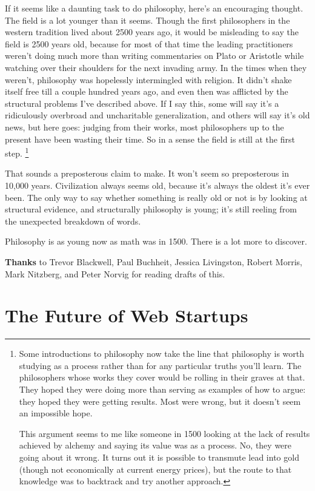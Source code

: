 \documentclass[12pt]{book}
\begin{document}
If it seems like a daunting task to do philosophy, here's an encouraging
thought. The field is a lot younger than it seems. Though the first
philosophers in the western tradition lived about 2500 years ago, it
would be misleading to say the field is 2500 years old, because for most
of that time the leading practitioners weren't doing much more than
writing commentaries on Plato or Aristotle while watching over their
shoulders for the next invading army. In the times when they weren't,
philosophy was hopelessly intermingled with religion. It didn't shake
itself free till a couple hundred years ago, and even then was afflicted
by the structural problems I've described above. If I say this, some
will say it's a ridiculously overbroad and uncharitable generalization,
and others will say it's old news, but here goes: judging from their
works, most philosophers up to the present have been wasting their time.
So in a sense the field is still at the first step.
\footnote{Some introductions to philosophy now take the line that
philosophy is worth studying as a process rather than for any particular
truths you'll learn. The philosophers whose works they cover would be
rolling in their graves at that. They hoped they were doing more than
serving as examples of how to argue: they hoped they were getting
results. Most were wrong, but it doesn't seem an impossible hope.

This argument seems to me like someone in 1500 looking at the lack of
results achieved by alchemy and saying its value was as a process. No,
they were going about it wrong. It turns out it is possible to transmute
lead into gold (though not economically at current energy prices), but
the route to that knowledge was to backtrack and try another approach.}

That sounds a preposterous claim to make. It won't seem so preposterous
in 10,000 years. Civilization always seems old, because it's always the
oldest it's ever been. The only way to say whether something is really
old or not is by looking at structural evidence, and structurally
philosophy is young; it's still reeling from the unexpected breakdown of
words.

Philosophy is as young now as math was in 1500. There is a lot more to
discover.


\textbf{Thanks} to Trevor Blackwell, Paul Buchheit, Jessica Livingston,
Robert Morris, Mark Nitzberg, and Peter Norvig for reading drafts of
this.
\chapter{The Future of Web Startups}
\end{document}
